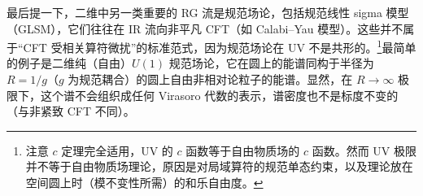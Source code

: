 最后提一下，二维中另一类重要的 RG 流是规范场论，包括规范线性 sigma 模型（GLSM），它们往往在 IR 流向非平凡 CFT（如 Calabi--Yau 模型）\cite{r55}。这些并不属于“CFT 受相关算符微扰”的标准范式，因为规范场论在 UV 不是共形的。\footnote{注意 $c$ 定理完全适用，UV 的 $c$ 函数等于自由物质场的 $c$ 函数。然而 UV 极限并不等于自由物质场理论，原因是对局域算符的规范单态约束，以及理论放在空间圆上时（模不变性所需）的和乐自由度。}最简单的例子是二维纯（自由）$U(1)$ 规范场论，它在圆上的能谱同构于半径为 $R=1/g$（$g$ 为规范耦合）的圆上自由非相对论粒子的能谱。显然，在 $R\to\infty$ 极限下，这个谱不会组织成任何 Virasoro 代数的表示，谱密度也不是标度不变的（与非紧致 CFT 不同）。
